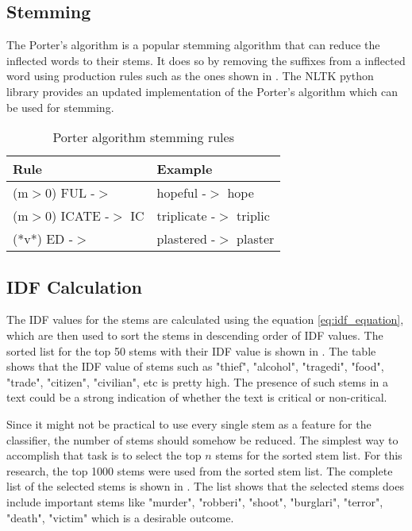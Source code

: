 \subsection{Stemming}
The Porter's algorithm\cite{porter1980algorithm} is a popular stemming algorithm that can reduce the inflected words to their stems. It does so by removing the suffixes from a inflected word using production rules such as the ones shown in . The NLTK python library provides an updated implementation of the Porter's algorithm which can be used for stemming.

\begin{table}
    \centering
    \caption{Porter algorithm stemming rules}
    \label{tbl:porter_algo}
    \begin{tabular}{p{4cm}p{4cm}}
    \toprule
    Rule&Example \\
    \midrule
    (m$>$0) FUL -$>$  &  hopeful -$>$ hope \\
    (m$>$0) ICATE -$>$ IC  & triplicate -$>$ triplic \\
    (*v*) ED -$>$ & plastered -$>$ plaster \\
    \bottomrule
    \end{tabular}
\end{table}

\subsection{IDF Calculation}
The IDF values for the stems are calculated using the equation \eqref{eq:idf_equation}, which are then used to sort the stems in descending order of IDF values. The sorted list for the top 50 stems with their IDF value is shown in . The table shows that the IDF value of stems such as "thief", "alcohol", "tragedi", "food", "trade", "citizen", "civilian", etc is pretty high. The presence of such stems in a text could be a strong indication of whether the text is critical or non-critical.

Since it might not be practical to use every single stem as a feature for the classifier, the number of stems should somehow be reduced. The simplest way to accomplish that task is to select the top $n$ stems for the sorted stem list. For this research, the top 1000 stems were used from the sorted stem list. The complete list of the selected stems is shown in . The list shows that the selected stems does include important stems like "murder", "robberi", "shoot", "burglari", "terror", "death", "victim" which is a desirable outcome.

